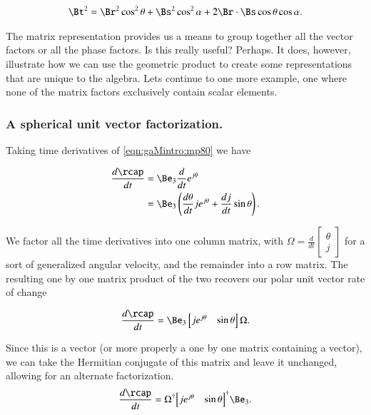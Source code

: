 \begin{align}\label{eqn:gaMintro:mp170}
\Bt^2 = 
\Br^2 \cos^2 \theta
+\Bs^2 \cos^2 \alpha
+ 2 \Br \cdot \Bs \cos\theta \cos\alpha.
\end{align}

The matrix representation provides us a means to group together all the vector factors or all the phase factors.  Is this really useful?  Perhaps.  It does, however, illustrate how we can use the geometric product to create some representations that are unique to the algebra.  Lets continue to one more example, one where none of the matrix factors exclusively contain scalar elements.

\subsubsection{A spherical unit vector factorization.}

Taking time derivatives of \ref{eqn:gaMintro:mp80} we have

\begin{align*}
\frac{d\rcap}{dt} 
&= \Be_3 \frac{d}{dt} e^{j \theta} \\
&= \Be_3 \left( \frac{d\theta}{dt} j e^{j \theta} + \frac{dj}{dt} \sin\theta \right).
\end{align*}

We factor all the time derivatives into one column matrix, with
$\Omega = 
\frac{d}{dt} \begin{bmatrix}
\theta \\
j
\end{bmatrix}$ for a sort of generalized angular velocity, and the remainder into a row matrix.  The resulting one by one matrix product of the two recovers our polar unit vector rate of change

\begin{align}\label{eqn:gaMintro:mp180}
\frac{d\rcap}{dt} 
= \Be_3 
\begin{bmatrix}
j e^{j \theta} & \sin\theta
\end{bmatrix}
\Omega.
\end{align}

Since this is a vector (or more properly a one by one matrix containing a vector), we can take the Hermitian conjugate of this matrix and leave it unchanged, allowing for an alternate factorization.
\begin{align}\label{eqn:gaMintro:mp190}
\frac{d\rcap}{dt} 
= 
\Omega^\dagger
{\begin{bmatrix}
j e^{j \theta} & \sin\theta
\end{bmatrix}}^\dagger
\Be_3.
\end{align}

